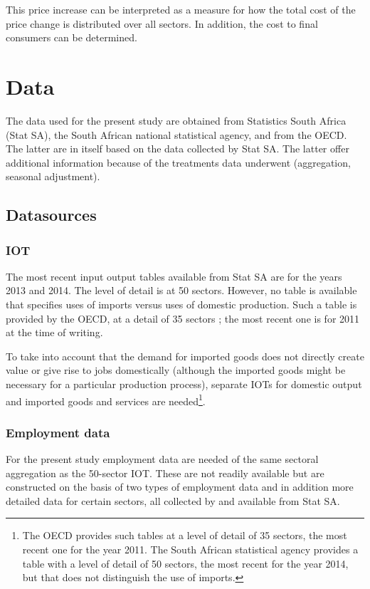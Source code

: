 \documentclass[12pt,english]{article}
\begin{document}
This price increase can be interpreted as a measure for how the total cost of the price change is distributed over all sectors. In addition, the cost to final consumers can be determined. 





\section{Data}

The data used for the present study are obtained from Statistics South Africa (Stat SA), the South African national statistical agency, and from the OECD. The latter are in itself based on the data collected by Stat SA. The latter offer additional information because of the treatments data underwent (aggregation, seasonal adjustment). %

\subsection{Datasources}

\subsubsection{IOT}	

The most recent input output tables available from Stat SA are for the years 2013 and 2014. The level of detail is at 50 sectors. However, no table is available that specifies uses of imports versus uses of domestic production. Such a table is provided by the OECD, at a detail of 35 sectors ; the most recent one is for 2011 at the time of writing.

To take into account that the demand for imported goods does not directly create value or give rise to jobs domestically (although the imported goods might be necessary for a particular production process), separate IOTs for domestic output and imported goods and services are needed\footnote{The OECD provides such tables at a level of detail of 35 sectors, the most recent one for the year 2011. The South African statistical agency provides a table with a level of detail of 50 sectors, the most recent for the year 2014, but that does not distinguish the use of imports.}. 

\subsubsection{Employment data}
For the present study employment data are needed of the same sectoral aggregation as the 50-sector IOT. These are not readily available but are constructed on the basis of two types of employment data and in addition more detailed data for certain sectors, all collected by and available from Stat SA.
 
\end{document}
